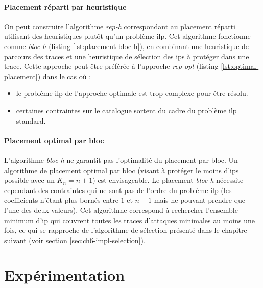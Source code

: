             \paragraph{Placement réparti par heuristique}
            On peut construire l'algorithme \textit{rep-h} correspondant au placement réparti utilisant des heuristiques plutôt qu'un problème \gls{ilp}.
            Cet algorithme fonctionne comme \textit{bloc-h} (listing \ref{lst:placement-bloc-h}), en combinant une heuristique de parcours des traces et une heuristique de sélection des \gls{ip}s à protéger dans une trace.
            Cette approche peut être préférée à l'approche \textit{rep-opt} (listing \ref{lst:optimal-placement}) dans le cas où :
            \begin{itemize}
                \item le problème \gls{ilp} de l'approche optimale est trop complexe pour être résolu.
                \item certaines contraintes sur le catalogue sortent du cadre du problème \gls{ilp} standard.
            \end{itemize}
             
            \paragraph{Placement optimal par bloc}         
            L'algorithme \textit{bloc-h} ne garantit pas l'optimalité du placement par bloc. Un algorithme de placement optimal par bloc (visant à protéger le moins d'\gls{ip}s possible avec un $K_n = n+1$) est envisageable.
            Le placement \textit{bloc-h} nécessite cependant des contraintes qui ne sont pas de l'ordre du problème \gls{ilp} (les coefficients n'étant plus bornés entre $1$ et $n + 1$ mais ne pouvant prendre que l'une des deux valeurs).
            Cet algorithme correspond à rechercher l'ensemble minimum d'\gls{ip} qui couvrent toutes les traces d'attaques minimales au moins une fois, ce qui se rapproche de l'algorithme de sélection présenté dans le chapitre suivant (voir section \ref{sec:ch6-impl-selection}). 
            
    \section{Expérimentation}
    \label{sec:placement-exps}
        
